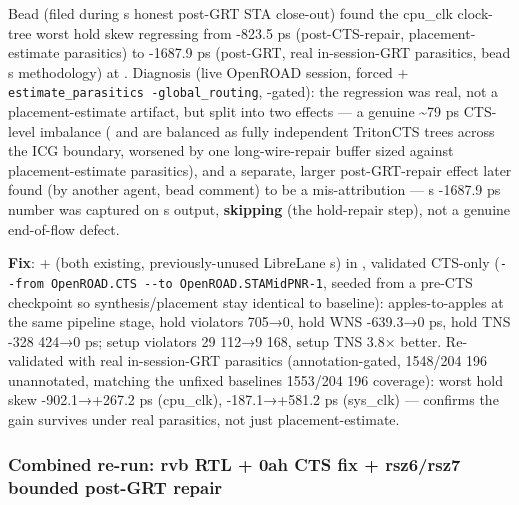 \begin{record}

Bead  (filed during \textquotesingle s honest
post-GRT STA close-out) found the cpu\_clk clock-tree worst hold skew
regressing from -823.5 ps (post-CTS-repair, placement-estimate
parasitics) to -1687.9 ps (post-GRT, real in-session-GRT parasitics,
bead \textquotesingle s methodology) at
. Diagnosis (live OpenROAD session, forced
 +
\texttt{estimate\_\allowbreak{}parasitics\ -\allowbreak{}global\_\allowbreak{}routing},
-gated): the regression was real, not
a placement-estimate artifact, but split into two effects --- a genuine
\textasciitilde79 ps CTS-level imbalance ( and
 are balanced as fully independent TritonCTS
trees across the  ICG boundary, worsened by one
long-wire-repair buffer sized against placement-estimate parasitics),
and a separate, larger post-GRT-repair effect later found (by another
agent, bead  comment) to be a mis-attribution ---
\textquotesingle s -1687.9 ps number was captured on
\textquotesingle s output, \textbf{skipping}
 (the hold-repair step), not a genuine
end-of-flow defect.

\textbf{Fix}:  + 
(both existing, previously-unused LibreLane s) in
, validated
CTS-only
(\texttt{-\allowbreak{}-\allowbreak{}from\ OpenROAD.\allowbreak{}CTS\ -\allowbreak{}-\allowbreak{}to\ OpenROAD.\allowbreak{}STAMidPNR-\allowbreak{}1},
seeded from a pre-CTS checkpoint so synthesis/\allowbreak{}placement
stay identical to baseline): apples-to-apples at the same pipeline
stage, hold violators 705→0, hold WNS -639.3→0 ps, hold TNS -328 424→0
ps; setup violators 29 112→9 168, setup TNS 3.8× better. Re-validated
with real in-session-GRT parasitics (annotation-gated, 1548/204 196
unannotated, matching the unfixed baseline\textquotesingle s 1553/204
196 coverage): worst hold skew -902.1→+267.2 ps (cpu\_\allowbreak{}clk),
-187.1→+581.2 ps (sys\_clk) --- confirms the gain survives under real
parasitics, not just placement-estimate.

\end{record}

\subsubsection{Combined re-run: rvb RTL + 0ah CTS fix + rsz6/rsz7
bounded post-GRT repair}\label{cr:run:phase5:combined-re-run-rvb-rtl-0ah-cts-fix-rsz6rsz7-bounded-post-grt-repair}


